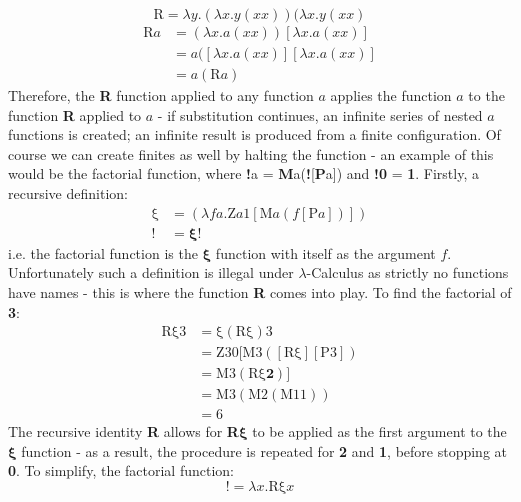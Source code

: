 \documentclass {article}
\begin{document}
\begin{equation*}
\bm{\mathrm{R}} = \lambda y.(\lambda x.y(xx))(\lambda x.y(xx)
\end{equation*}
\begin{equation*}
\begin{aligned}
\bm{\mathrm{R}}a &= (\lambda x.a(xx))[\lambda x.a(xx)]\\
&= a([\lambda x.a(xx)][\lambda x.a(xx)]\\
&= a(\bm{\mathrm{R}}a)
\end{aligned}
\end{equation*}
Therefore, the \textbf{R} function applied to any function $a$ applies the function $a$ to the function \textbf{R} applied to $a$ - if substitution continues, an infinite series of nested $a$ functions is created; an infinite result is produced from a finite configuration. Of course we can create finites as well by halting the function - an example of this would be the factorial function, where \textbf{!}a = \textbf{M}a(\textbf{!}[\textbf{P}a]) and \textbf{!0} = \textbf{1}. Firstly, a recursive definition:
\begin{equation*}
\begin{aligned}
\bm{\mathrm{\xi}} &= (\lambda fa.\bm{\mathrm{Z}}a\bm{\mathrm{1}}[\bm{\mathrm{M}}a(f[\bm{\mathrm{P}}a])])\\
\bm{!} &= \bm{\xi}!
\end{aligned}
\end{equation*}
i.e. the factorial function is the $\bm{\xi}$ function with itself as the argument $f$. Unfortunately such a definition is illegal under $\lambda$-Calculus as strictly no functions have names - this is where the function \textbf{R} comes into play. To find the factorial of \textbf{3}:
\begin{equation*}
\begin{aligned}
\bm{\mathrm{R\xi 3}} &= \bm{\mathrm{\xi}}(\bm{\mathrm{R\xi}})\bm{\mathrm{3}}\\
&= \bm{\mathrm{Z30}}[\bm{\mathrm{M3}}([\bm{\mathrm{R\xi}}][\bm{\mathrm{P3}}])\\
&= \bm{\mathrm{M3}}(\bm{\mathrm{R\xi}}\bm{2})]\\
&= \bm{\mathrm{M3}}(\bm{\mathrm{M2}}(\bm{\mathrm{M11}}))\\
&= \bm{\mathrm{6}}
\end{aligned}
\end{equation*}
The recursive identity \textbf{R} allows for \textbf{R}$\bm{\xi}$ to be applied as the first argument to the $\bm{\xi}$ function - as a result, the procedure is repeated for \textbf{2} and \textbf{1}, before stopping at \textbf{0}. To simplify, the factorial function:
\begin{equation*}
\bm{!} = \lambda x.\bm{\mathrm{R\xi}}x
\end{equation*}
\end{document}
